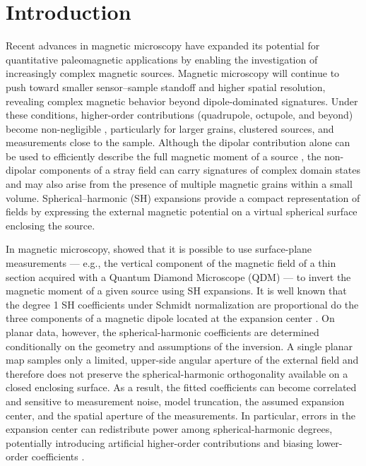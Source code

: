 \setcounter{MaxMatrixCols}{15}

\section{Introduction}

Recent advances in magnetic microscopy have expanded its potential for quantitative paleomagnetic applications by enabling the investigation of increasingly complex magnetic sources. Magnetic microscopy will continue to push toward smaller sensor–sample standoff and higher spatial resolution, revealing complex magnetic behavior beyond dipole-dominated signatures. Under these conditions, higher-order contributions (quadrupole, octupole, and beyond) become non-negligible \citep[\textit{e.g.,}][]{CortesOrtuno2021, CortesOrtuno2022, Bellon2026}, particularly for larger grains, clustered sources, and measurements close to the sample. Although the dipolar contribution alone can be used to efficiently describe the full magnetic moment of a source \citep{Bellon2026}, the non-dipolar components of a stray field can carry signatures of complex domain states \citep{Fabian2019,CortesOrtuno2022} and may also arise from the presence of multiple magnetic grains within a small volume. Spherical–harmonic (SH) expansions \citep{CortesOrtuno2022,Lima2023} provide a compact representation of fields by expressing the external magnetic potential on a virtual spherical surface enclosing the source.

In magnetic microscopy,  \citet{Lima2023} showed that it is possible to use surface-plane measurements — e.g., the vertical component of the magnetic field of a thin section acquired with a Quantum Diamond Microscope (QDM) — to invert the magnetic moment of a given source using SH expansions. It is well known that the degree 1 SH coefficients under Schmidt normalization are proportional do the three components of a magnetic dipole located at the expansion center \citep{Blakely1996}. On planar data, however, the spherical-harmonic coefficients are determined conditionally on the geometry and assumptions of the inversion. A single planar map samples only a limited, upper-side angular aperture of the external field and therefore does not preserve the spherical-harmonic orthogonality available on a closed enclosing surface. As a result, the fitted coefficients can become correlated and sensitive to measurement noise, model truncation, the assumed expansion center, and the spatial aperture of the measurements. In particular, errors in the expansion center can redistribute power among spherical-harmonic degrees, potentially introducing artificial higher-order contributions and biasing lower-order coefficients \citep{Lima2023}.

